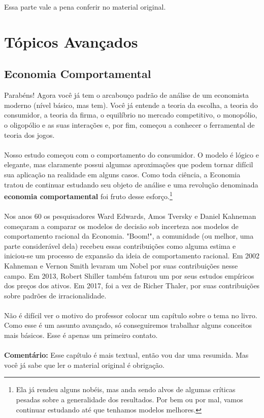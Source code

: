 \documentclass[a4paper,11pt,oneside]{book}
\theoremstyle{definition}
\theoremstyle{break}
\begin{document}
Essa parte vale a pena conferir no material original.

\part{Tópicos Avançados}

\chapter{Economia Comportamental}

Parabéns! Agora você já tem o arcabouço padrão de análise de um economista moderno (nível básico, mas tem). Você já entende a teoria da escolha, a teoria do consumidor, a teoria da firma, o equilíbrio no mercado competitivo, o monopólio, o oligopólio e as suas interações e, por fim, começou a conhecer o ferramental de teoria dos jogos.
\\
\\
Nosso estudo começou com o comportamento do consumidor. O modelo é lógico e elegante, mas claramente possui algumas aproximações que podem tornar difícil sua aplicação na realidade em alguns casos. Como toda ciência, a Economia tratou de continuar estudando seu objeto de análise e uma revolução denominada \textbf{economia comportamental} foi fruto desse esforço.\footnote{Ela já rendeu alguns nobéis, mas anda sendo alvos de algumas críticas pesadas sobre a generalidade dos resultados. Por bem ou por mal, vamos continuar estudando até que tenhamos modelos melhores.}
\\
\\
Nos anos 60 os pesquisadores Ward Edwards, Amos Tversky e Daniel Kahneman começaram a comparar os modelos de decisão sob incerteza aos modelos de comportamento racional da Economia. "Boom!", a comunidade (ou melhor, uma parte considerável dela) recebeu essas contribuições como alguma estima e iniciou-se um processo de expansão da ideia de comportamento racional. Em 2002 Kahneman e Vernon Smith levaram um Nobel por suas contribuições nesse campo. Em 2013, Robert Shiller também faturou um por seus estudos empíricos dos preços dos ativos. Em 2017, foi a vez de Richer Thaler, por suas contribuições sobre padrões de irracionalidade.
\\
\\
Não é difícil ver o motivo do professor colocar um capítulo sobre o tema no livro. Como esse é um assunto avançado, só conseguiremos trabalhar alguns conceitos mais básicos. Esse é apenas um primeiro contato.
\\
\\
\textbf{Comentário:} Esse capítulo é mais textual, então vou dar uma resumida. Mas você já sabe que ler o material original é obrigação.
\end{document}
